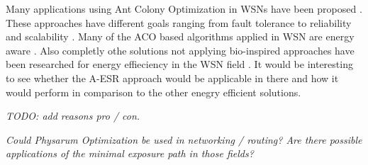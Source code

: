 \documentclass{IWORK2014}
\begin{document}
Many applications using Ant Colony Optimization in WSNs have been proposed \cite{bennis2013enhanced, zhang2004improvements, camilo2006energy, cai2006aco, sun2008asar, kiri2007self, ghasemaghaei2007ant}. These approaches have different goals ranging from fault tolerance \cite{zhang2004improvements} to reliability and scalability \cite{kiri2007self}. Many of the ACO based algorithms applied in WSN are energy aware \cite{saleem2011swarm}. Also completly othe solutions not applying bio-inspired approaches have been researched for energy effieciency in the WSN field \cite{wightman2008a3}. It would be interesting to see whether the A-ESR approach would be applicable in there and how it would perform in comparison to the other enegry efficient solutions.

\textit{TODO: add reasons pro / con.}

\textit{Could Physarum Optimization be used in networking / routing? Are there possible applications of the minimal exposure path in those fields?}



\end{document}
